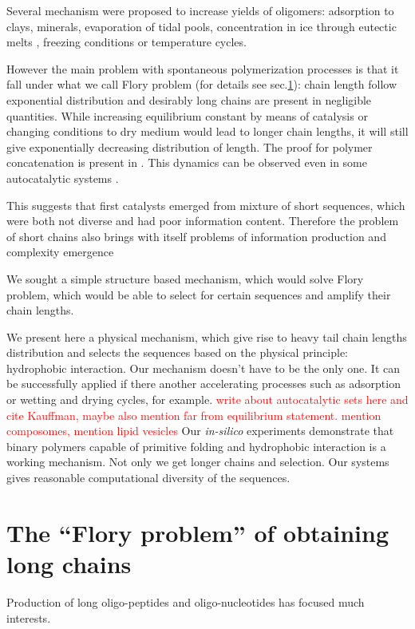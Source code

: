 \documentclass[twoside,twocolumn,9pt]{article}
\newcommand{\red}[1]{\textcolor{red}{#1}}
\begin{document}
Several mechanism were proposed to increase yields of oligomers: adsorption to 
clays\cite{Rao1980,Lambert2008}, minerals\cite{Bernal1949,Ferris1996}, evaporation of tidal 
pools\cite{Nelson2001}, concentration in ice through eutectic melts \cite{Kanavarioti2001}, 
freezing conditions\cite{Bada2004} or temperature cycles. 

However the main problem with spontaneous polymerization processes is that it fall under what we 
call Flory problem (for details see 
sec.\ref{sec:flory}): chain length follow exponential distribution and desirably long chains are 
present in negligible quantities. While increasing equilibrium constant by means of catalysis or 
changing conditions to dry medium would lead to longer chain lengths, it will still give 
exponentially decreasing distribution of length. The proof for polymer concatenation is present 
in \cite{Derr2012}. This dynamics can be observed even in some autocatalytic systems \cite{Wu2009}.

This suggests that first catalysts emerged from mixture of short sequences, which were both 
not diverse and had poor information content. Therefore the problem of short chains also brings 
with itself problems of information production and complexity emergence \cite{Joyce1987,Abel2005}

 We sought a simple structure based mechanism, 
which would solve Flory problem, which would be able to select for certain sequences and 
amplify their chain lengths.

 We present here a physical mechanism, which give rise to 
heavy tail chain lengths distribution and selects the sequences based on the physical principle: 
hydrophobic interaction. Our mechanism doesn't have to be the only one. It can be successfully 
applied if there another accelerating processes such as adsorption or wetting and drying cycles, 
for example.
\red{write about autocatalytic sets here and cite Kauffman, maybe also mention far from 
equilibrium statement. mention composomes, mention lipid vesicles \cite{Luisi1999,Deamer2008}}
Our \textit{in-silico} experiments demonstrate that binary polymers 
capable of primitive folding and hydrophobic interaction is a working mechanism. Not only we get 
longer chains and selection. Our systems gives reasonable computational diversity of the sequences.


   
\section{The ``Flory problem'' of obtaining long chains}
\label{sec:flory} Production of long oligo-peptides and oligo-nucleotides 
has focused much interests\cite{Shapiro1984,Ferris1996,Kanavarioti2001,Brack2007,Danger2012}.
\end{document}
